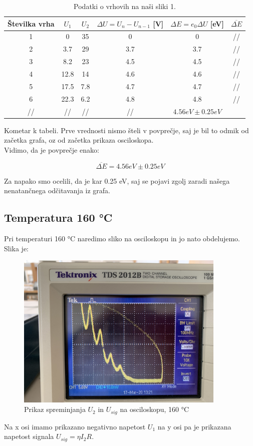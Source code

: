 \documentclass[11pt, a4paper]{article}
\theoremstyle{definition}
\theoremstyle{example}
\theoremstyle{izrek}
\begin{document}
\begin{table}[h]
	\centering
	\begin{tabular}{|c|c|c|c|c|c|}
		\hline
		
		Številka vrha & $U_1$& $U_2$ & $\Delta U = U_{n}- U_{n-1}$ [V] & $\Delta E= e_0\Delta U $ [eV] & $\overline{\Delta E}$\\
		\hline
		\hline
		1 & 0 & 35 & 0 & 0 & //\\
		\hline
		2 & 3.7 & 29 & 3.7 & 3.7 &// \\
		\hline
		3 & 8.2 & 23 & 4.5 & 4.5 & //\\
		\hline
		4 & 12.8 & 14 & 4.6 & 4.6 & //\\
		\hline
		5 & 17.5 & 7.8 &4.7 & 4.7 &//\\
		\hline
		6 & 22.3 & 6.2 & 4.8 & 4.8 & //\\
		\hline
		//& //& //&// & $4.56 eV \pm 0.25 eV$\\ 
		\hline
		\hline
	\end{tabular}
	\caption{Podatki o vrhovih na naši sliki 1.}		\label{180 °C}
\end{table}
Kometar k tabeli. Prve vrednosti nismo šteli v povprečje, saj je bil to odmik od začetka grafa, oz od začetka prikaza osciloskopa. \\
Vidimo, da je povprečje enako: 

$$\overline{\Delta E}=4.56 eV \pm 0.25 eV$$

Za napako smo ocelili, da je kar 0.25 eV, saj se pojavi zgolj zaradi našega nenatančnega odčitavanja iz grafa. 
\subsection{Temperatura 160 °C}
Pri temperaturi 160 °C naredimo sliko na osciloskopu in jo nato obdelujemo. Slika je: 

\begin{figure}[H]
    \centering
    \includegraphics[width=10cm]{T=160_max_napetost.jpg}
    \caption{Prikaz spreminjanja $U_2$ in $U_{sig}$ na osciloskopu, 160 °C}
\end{figure}
Na x osi imamo prikazano negativno napetost $U_1$ na y osi pa je prikazana napetost signala $U_{sig}=\eta I_2 R.$
\end{document}
